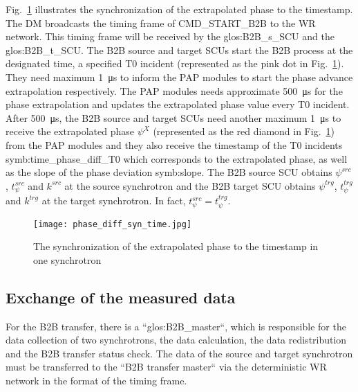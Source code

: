 Fig.~\ref{phase_diff_syn_time} illustrates the synchronization of the extrapolated phase to the timestamp. The DM broadcasts the timing frame of CMD\_START\_B2B to the WR network. This timing frame will be received by the \gls{glos:B2B_s_SCU} and the \gls{glos:B2B_t_SCU}. The B2B source and target SCUs start the B2B process at the designated time, a specified T0 incident (represented as the pink dot in Fig.~\ref{phase_diff_syn_time}). They need maximum \SI{1}{\us} to inform the PAP modules to start the phase advance extrapolation respectively. The PAP modules needs approximate \SI{500}{\us} for the phase extrapolation and updates the extrapolated phase value every T0 incident. After \SI{500}{\us}, the B2B source and target SCUs need another maximum \SI{1}{\us} to receive the extrapolated phase $\psi^X$ (represented as the red diamond in Fig.~\ref{phase_diff_syn_time}) from the PAP modules and they also receive the timestamp of the T0 incidents \gls{symb:time_phase_diff_T0} which corresponds to the extrapolated phase, as well as the slope of the phase deviation \gls{symb:slope}. The B2B source SCU obtains $\psi^\mathit{src}$, $t_\psi^\mathit{src}$ and $k^\mathit{src}$ at the source synchrotron and the B2B target SCU obtains $\psi^\mathit{trg}$, $t_\psi^\mathit{trg}$ and $k^\mathit{trg}$ at the target synchrotron. In fact, $t_\psi^\mathit{src}=t_\psi^\mathit{trg}$.
 \begin{figure}[!htb]
   \centering   
   \texttt{[image: phase\_diff\_syn\_time.jpg]}
   \caption{The synchronization of the extrapolated phase to the timestamp in one synchrotron}
   \label{phase_diff_syn_time}
\end{figure}
\subsection{Exchange of the measured data}

For the B2B transfer, there is a ``\gls{glos:B2B_master}``, which is responsible for the data collection of two synchrotrons, the data calculation, the data redistribution and the B2B transfer status check. The data of the source and target synchrotron must be transferred to the ``B2B transfer master`` via the deterministic WR network in the format of the timing frame.
 
